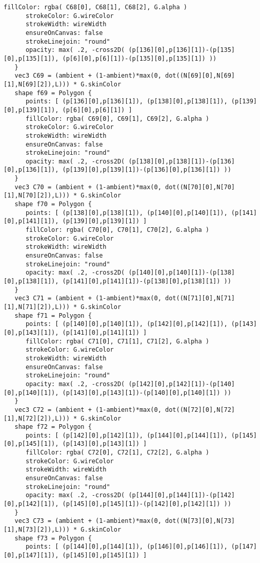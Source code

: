 \begin{lstlisting}[language=Sty-RT,escapechar=@]
      fillColor: rgba( C68[0], C68[1], C68[2], G.alpha )
      strokeColor: G.wireColor
      strokeWidth: wireWidth
      ensureOnCanvas: false
      strokeLinejoin: "round"
      opacity: max( .2, -cross2D( (p[136][0],p[136][1])-(p[135][0],p[135][1]), (p[6][0],p[6][1])-(p[135][0],p[135][1]) ))
   }
   vec3 C69 = (ambient + (1-ambient)*max(0, dot((N[69][0],N[69][1],N[69][2]),L))) * G.skinColor
   shape f69 = Polygon {
      points: [ (p[136][0],p[136][1]), (p[138][0],p[138][1]), (p[139][0],p[139][1]), (p[6][0],p[6][1]) ]
      fillColor: rgba( C69[0], C69[1], C69[2], G.alpha )
      strokeColor: G.wireColor
      strokeWidth: wireWidth
      ensureOnCanvas: false
      strokeLinejoin: "round"
      opacity: max( .2, -cross2D( (p[138][0],p[138][1])-(p[136][0],p[136][1]), (p[139][0],p[139][1])-(p[136][0],p[136][1]) ))
   }
   vec3 C70 = (ambient + (1-ambient)*max(0, dot((N[70][0],N[70][1],N[70][2]),L))) * G.skinColor
   shape f70 = Polygon {
      points: [ (p[138][0],p[138][1]), (p[140][0],p[140][1]), (p[141][0],p[141][1]), (p[139][0],p[139][1]) ]
      fillColor: rgba( C70[0], C70[1], C70[2], G.alpha )
      strokeColor: G.wireColor
      strokeWidth: wireWidth
      ensureOnCanvas: false
      strokeLinejoin: "round"
      opacity: max( .2, -cross2D( (p[140][0],p[140][1])-(p[138][0],p[138][1]), (p[141][0],p[141][1])-(p[138][0],p[138][1]) ))
   }
   vec3 C71 = (ambient + (1-ambient)*max(0, dot((N[71][0],N[71][1],N[71][2]),L))) * G.skinColor
   shape f71 = Polygon {
      points: [ (p[140][0],p[140][1]), (p[142][0],p[142][1]), (p[143][0],p[143][1]), (p[141][0],p[141][1]) ]
      fillColor: rgba( C71[0], C71[1], C71[2], G.alpha )
      strokeColor: G.wireColor
      strokeWidth: wireWidth
      ensureOnCanvas: false
      strokeLinejoin: "round"
      opacity: max( .2, -cross2D( (p[142][0],p[142][1])-(p[140][0],p[140][1]), (p[143][0],p[143][1])-(p[140][0],p[140][1]) ))
   }
   vec3 C72 = (ambient + (1-ambient)*max(0, dot((N[72][0],N[72][1],N[72][2]),L))) * G.skinColor
   shape f72 = Polygon {
      points: [ (p[142][0],p[142][1]), (p[144][0],p[144][1]), (p[145][0],p[145][1]), (p[143][0],p[143][1]) ]
      fillColor: rgba( C72[0], C72[1], C72[2], G.alpha )
      strokeColor: G.wireColor
      strokeWidth: wireWidth
      ensureOnCanvas: false
      strokeLinejoin: "round"
      opacity: max( .2, -cross2D( (p[144][0],p[144][1])-(p[142][0],p[142][1]), (p[145][0],p[145][1])-(p[142][0],p[142][1]) ))
   }
   vec3 C73 = (ambient + (1-ambient)*max(0, dot((N[73][0],N[73][1],N[73][2]),L))) * G.skinColor
   shape f73 = Polygon {
      points: [ (p[144][0],p[144][1]), (p[146][0],p[146][1]), (p[147][0],p[147][1]), (p[145][0],p[145][1]) ]

\end{lstlisting}
